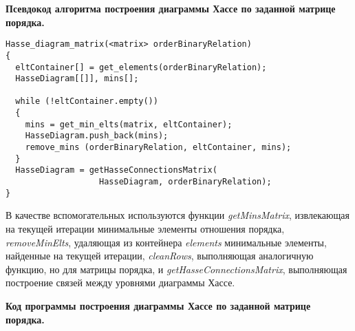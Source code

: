 \documentclass[spec, och, otchet, hidelinks]{SCWorks}
\begin{document}
\par \textbf{Псевдокод алгоритма построения диаграммы Хассе по заданной матрице порядка.}

\begin{lstlisting}[caption=Псевдокод алгоритма., mathescape]
Hasse_diagram_matrix(<matrix> orderBinaryRelation)
{
  eltContainer[] = get_elements(orderBinaryRelation);
  HasseDiagram[[]], mins[];

  while (!eltContainer.empty())
  {
    mins = get_min_elts(matrix, eltContainer);
    HasseDiagram.push_back(mins);
    remove_mins (orderBinaryRelation, eltContainer, mins);
  }
  HasseDiagram = getHasseConnectionsMatrix(
                   HasseDiagram, orderBinaryRelation);
}
\end{lstlisting}

\par В качестве вспомогательных используются функции \textit{getMinsMatrix},
извлекающая на текущей итерации минимальные элементы отношения порядка,
\textit{removeMinElts}, удаляющая из контейнера \textit{elements} минимальные
элементы, найденные на текущей итерации, \textit{cleanRows}, выполняющая
аналогичную функцию, но для матрицы порядка, и
\textit{getHasseConnectionsMatrix}, выполняющая построение связей между уровнями
диаграммы Хассе.
\\
\par \textbf{Код программы построения диаграммы Хассе по заданной матрице порядка.}
\end{document}
